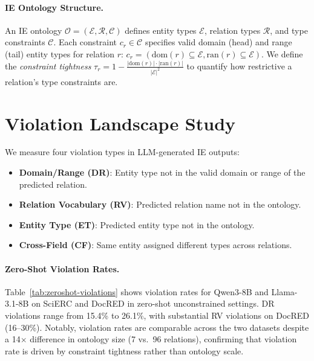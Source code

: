 \documentclass[11pt,a4paper]{article}
\begin{document}
\paragraph{IE Ontology Structure.}
An IE ontology $\mathcal{O} = (\mathcal{E}, \mathcal{R}, \mathcal{C})$ defines entity types $\mathcal{E}$, relation types $\mathcal{R}$, and type constraints $\mathcal{C}$.
Each constraint $c_r \in \mathcal{C}$ specifies valid domain (head) and range (tail) entity types for relation $r$: $c_r = (\text{dom}(r) \subseteq \mathcal{E}, \text{ran}(r) \subseteq \mathcal{E})$.
We define the \emph{constraint tightness} $\tau_r = 1 - \frac{|\text{dom}(r)| \cdot |\text{ran}(r)|}{|\mathcal{E}|^2}$ to quantify how restrictive a relation's type constraints are.

\section{Violation Landscape Study}
\label{sec:landscape}

We measure four violation types in LLM-generated IE outputs:
\begin{itemize}
  \item \textbf{Domain/Range (DR)}: Entity type not in the valid domain or range of the predicted relation.
  \item \textbf{Relation Vocabulary (RV)}: Predicted relation name not in the ontology.
  \item \textbf{Entity Type (ET)}: Predicted entity type not in the ontology.
  \item \textbf{Cross-Field (CF)}: Same entity assigned different types across relations.
\end{itemize}

\paragraph{Zero-Shot Violation Rates.}
Table~\ref{tab:zeroshot-violations} shows violation rates for Qwen3-8B and Llama-3.1-8B on SciERC and DocRED in zero-shot unconstrained settings.
DR violations range from 15.4\% to 26.1\%, with substantial RV violations on DocRED (16--30\%).
Notably, violation rates are comparable across the two datasets despite a 14$\times$ difference in ontology size (7 vs.\ 96 relations), confirming that violation rate is driven by constraint tightness rather than ontology scale.
\end{document}
